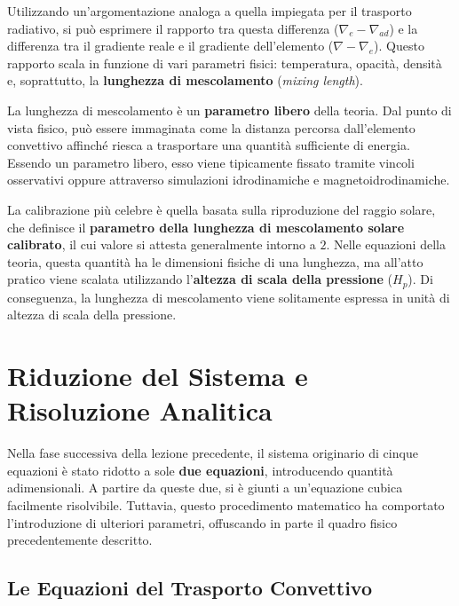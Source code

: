 Utilizzando un'argomentazione analoga a quella impiegata per il trasporto radiativo, si può esprimere il rapporto tra questa differenza ($\nabla_{e} - \nabla_{ad}$) e la differenza tra il gradiente reale e il gradiente dell'elemento ($\nabla - \nabla_{e}$). Questo rapporto scala in funzione di vari parametri fisici: temperatura, opacità, densità e, soprattutto, la \textbf{lunghezza di mescolamento} (\textit{mixing length}).

La lunghezza di mescolamento è un \textbf{parametro libero} della teoria. Dal punto di vista fisico, può essere immaginata come la distanza percorsa dall'elemento convettivo affinché riesca a trasportare una quantità sufficiente di energia. Essendo un parametro libero, esso viene tipicamente fissato tramite vincoli osservativi oppure attraverso simulazioni idrodinamiche e magnetoidrodinamiche.

La calibrazione più celebre è quella basata sulla riproduzione del raggio solare, che definisce il \textbf{parametro della lunghezza di mescolamento solare calibrato}, il cui valore si attesta generalmente intorno a $2$. Nelle equazioni della teoria, questa quantità ha le dimensioni fisiche di una lunghezza, ma all'atto pratico viene scalata utilizzando l'\textbf{altezza di scala della pressione} ($H_p$). Di conseguenza, la lunghezza di mescolamento viene solitamente espressa in unità di altezza di scala della pressione.

\section{Riduzione del Sistema e Risoluzione Analitica}

Nella fase successiva della lezione precedente, il sistema originario di cinque equazioni è stato ridotto a sole \textbf{due equazioni}, introducendo quantità adimensionali. A partire da queste due, si è giunti a un'equazione cubica facilmente risolvibile. Tuttavia, questo procedimento matematico ha comportato l'introduzione di ulteriori parametri, offuscando in parte il quadro fisico precedentemente descritto.

\subsection{Le Equazioni del Trasporto Convettivo}

